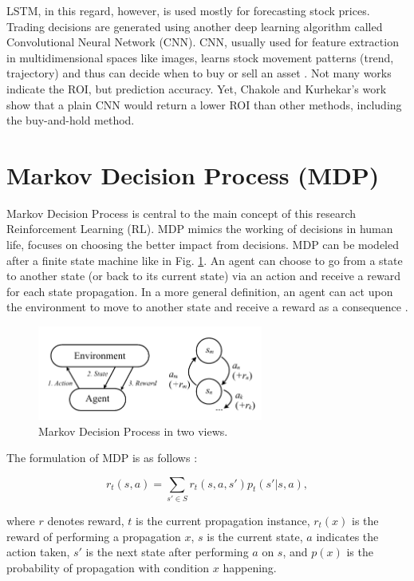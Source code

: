LSTM, in this regard, however, is used mostly for forecasting stock prices. Trading decisions are generated using another deep learning algorithm called Convolutional Neural Network (CNN). CNN, usually used for feature extraction in multidimensional spaces like images, learns stock movement patterns (trend, trajectory) and thus can decide when to buy or sell an asset \cite{AT21}. Not many works indicate the ROI, but prediction accuracy. Yet, Chakole and Kurhekar's work \cite{AT21} show that a plain CNN would return a lower ROI than other methods, including the buy-and-hold method.

\section{Markov Decision Process (MDP)}
\indent\indent Markov Decision Process is central to the main concept of this research Reinforcement Learning (RL). MDP mimics the working of decisions in human life, focuses on choosing the better impact from decisions. MDP can be modeled after a finite state machine like in Fig. \ref{fig:3mdp}. An agent can choose to go from a state to another state (or back to its current state) via an action and receive a reward for each state propagation. In a more general definition, an agent can act upon the environment to move to another state and receive a reward as a consequence \cite{ML01}.

\begin{figure}[h]
    \centering
    \includegraphics[width=0.66\textwidth]{graphics/3mdp.pdf}
    \caption{Markov Decision Process in two views.}
    \label{fig:3mdp}
\end{figure}

The formulation of MDP is as follows \cite{ML01}:

\[
r_t(s,a)=\sum_{s'\in{}S}r_t(s,a,s')p_t(s'|s,a),
\]

where $r$ denotes reward, $t$ is the current propagation instance, $r_t(x)$ is the reward of performing a propagation $x$, $s$ is the current state, $a$ indicates the action taken, $s'$ is the next state after performing $a$ on $s$, and $p(x)$ is the probability of propagation with condition $x$ happening.

